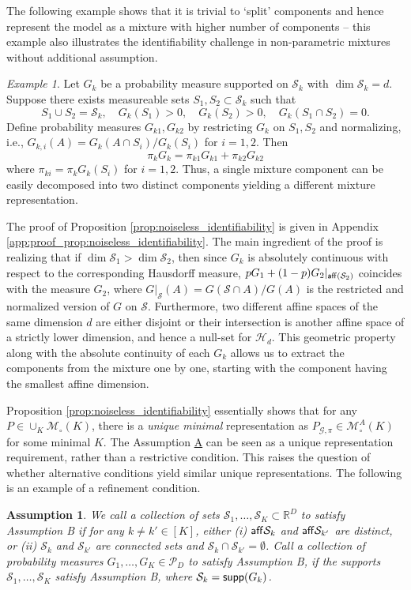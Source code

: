 \documentclass[bj,authoryear]{imsart}
\theoremstyle{plain}
\newtheorem{assumption}{Assumption}
\theoremstyle{remark}
\newtheorem{example}{Example}
\def\aff{{\sf aff}}
\def\bbR{\mathbb{R}}
\def\cG{\mathcal{G}}
\def\cH{\mathcal{H}}
\def\cM{\mathcal{M}}
\def\cP{\mathcal{P}}
\def\cS{\mathcal{S}}
\def\supp{{\sf supp}}
\begin{document}
The following example shows that it is trivial to `split' components and hence represent the model as a mixture with higher number of components -- this example also illustrates the identifiability challenge in non-parametric mixtures without additional assumption.
\begin{example}
    Let $G_k$ be a probability measure supported on $\cS_k$ with $\dim \cS_k=d$. Suppose there exists measureable sets $S_1,S_2\subset \cS_k$ such that
    $$S_1\cup S_2=\cS_k, \quad G_k(S_1)>0, \quad G_k(S_2)>0, \quad G_k(S_1\cap S_2) =0.$$
    Define probability measures $G_{k1},G_{k2}$ by restricting $G_k$ on $S_1,S_2$ and normalizing, i.e., $G_{k,i}(A)=G_k(A\cap S_i)/G_k(S_i)$ for $i=1,2$. Then
    $$\pi_k G_k = \pi_{k1}G_{k1} + \pi_{k2} G_{k2}$$
    where $\pi_{ki}=\pi_k G_k(S_i)$ for $i=1,2$. Thus, a single mixture component can be easily decomposed into two distinct components yielding a different mixture representation.
\end{example}

 
The proof of Proposition \ref{prop:noiseless_identifiability} is given in Appendix \ref{app:proof_prop:noiseless_identifiability}. The main ingredient of the proof is realizing that if $\dim \cS_1 > \dim \cS_2$, then since $G_k$ is absolutely continuous with respect to the corresponding Hausdorff measure, $pG_1 + (1-p)G_2|_{\aff(\cS_2)}$ coincides with the measure $G_2$, where $G|_{\cS}(A)=G(\cS\cap A)/G(A)$ is the restricted and normalized version of $G$ on $\cS$. Furthermore, two different affine spaces of the same dimension $d$ are either disjoint or their intersection is another affine space of a strictly lower dimension, and hence a null-set for $\cH_d$. This geometric property along with the absolute continuity of each $G_k$ allows us to extract the components from the mixture one by one, starting with the component having the smallest affine dimension. 

Proposition \ref{prop:noiseless_identifiability} essentially shows that for any $P\in \cup_K \cM_\circ(K)$, there is a \textit{unique minimal} representation as $P_{\cG,\pi}\in \cM_\circ^A(K)$ for some minimal $K$. The Assumption \hyperref[assume:A]{A} can be seen as a unique representation requirement, rather than a restrictive condition. This raises the question of whether alternative conditions yield similar unique representations.
The following is an example of a refinement condition.

\begin{assumption}\label{assume:B}
We call a collection of sets $\cS_1,\dots,\cS_K\subset \bbR^D$ to satisfy Assumption B if for any $k\neq k'\in[K]$, either (i) $\aff\cS_k$ and $\aff \cS_{k'}$ are distinct, or (ii) $\cS_k$ and $\cS_{k'}$ are connected sets and $\cS_k\cap \cS_{k'}=\emptyset$. Call a collection of probability measures $G_1,\dots,G_K\in \cP_D$ to satisfy Assumption B, if the supports $\cS_1,\dots,\cS_K$ satisfy Assumption B, where $\cS_k=\supp(G_k)$.
\end{assumption}
\end{document}
